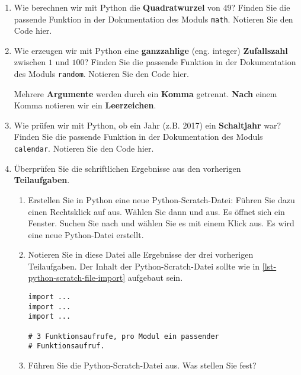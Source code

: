 \begin{enumerate}
	\item Wie berechnen wir mit Python die \textbf{Quadratwurzel} von $49$? Finden Sie die passende Funktion in der Dokumentation des Moduls \lstinline{math}. Notieren Sie den Code hier.
	\fillwithgrid{0.75in}
	\item Wie erzeugen wir mit Python eine \textbf{ganzzahlige} (eng. integer) \textbf{Zufallszahl} zwischen $1$ und $100$? Finden Sie die passende Funktion in der Dokumentation des Moduls \lstinline{random}. Notieren Sie den Code hier.
	\fillwithgrid{0.75in}

\begin{cleancode}[Leerzeichen 1]
Mehrere \textbf{Argumente} werden durch ein \textbf{Komma} getrennt. \textbf{Nach} einem Komma notieren wir ein \textbf{Leerzeichen}.
\end{cleancode}

		\item Wie prüfen wir mit Python, ob ein Jahr (z.B. 2017) ein \textbf{Schaltjahr} war? Finden Sie die passende Funktion in der Dokumentation des Moduls \lstinline{calendar}. Notieren Sie den Code hier.
	\fillwithgrid{0.75in}
	\item Überprüfen Sie die schriftlichen Ergebnisse aus den vorherigen \textbf{Teilaufgaben}.
	\begin{enumerate}
	\item Erstellen Sie in Python eine neue Python-Scratch-Datei: Führen Sie dazu einen Rechtsklick auf  aus. Wählen Sie dann  und  aus. Es öffnet sich ein Fenster. Suchen Sie nach  und wählen Sie es mit einem Klick aus. Es wird eine neue Python-Datei erstellt.
	\item Notieren Sie in diese Datei alle Ergebnisse der drei vorherigen Teilaufgaben. Der Inhalt der Python-Scratch-Datei sollte wie in \autoref{lst-python-scratch-file-import} aufgebaut sein.
	
\begin{lstlisting}[caption={Vorlage für die Python-Scratch-Datei.}, label={lst-python-scratch-file-import}]
import ...
import ...
import ...

# 3 Funktionsaufrufe, pro Modul ein passender 
# Funktionsaufruf.
\end{lstlisting}
	\item Führen Sie die Python-Scratch-Datei aus. Was stellen Sie fest?
	\end{enumerate}
\end{enumerate}

